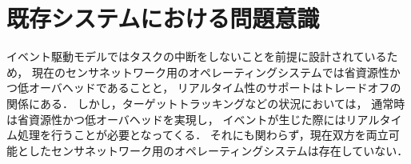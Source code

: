 %
%
%
%
%
%
%
%



\section{既存システムにおける問題意識}
イベント駆動モデルではタスクの中断をしないことを前提に設計されているため，
現在のセンサネットワーク用のオペレーティングシステムでは省資源性かつ低オーバヘッドであることと，
リアルタイム性のサポートはトレードオフの関係にある．
しかし，ターゲットトラッキングなどの状況においては，
通常時は省資源性かつ低オーバヘッドを実現し，
イベントが生じた際にはリアルタイム処理を行うことが必要となってくる．
それにも関わらず，現在双方を両立可能としたセンサネットワーク用のオペレーティングシステムは存在していない．

